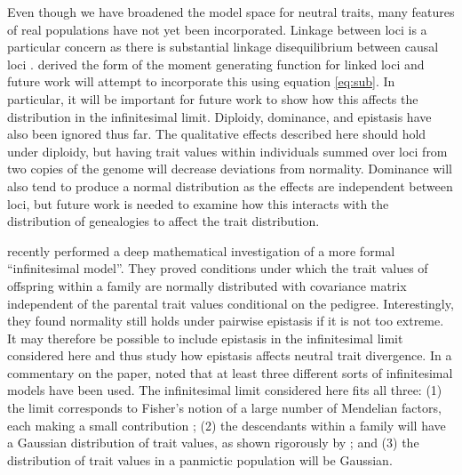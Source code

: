 Even though we have broadened the model space for neutral traits, many features
of real populations have not yet been incorporated. Linkage between loci is a
particular concern as there is substantial linkage disequilibrium between causal
loci \citep{Bulik-Sullivan2015}. \citet{Lohse2011} derived the form of the
moment generating function for linked loci and future work will attempt to
incorporate this using equation \eqref{eq:sub}. In particular, it will be
important for future work to show how this affects the distribution in the
infinitesimal limit. Diploidy, dominance, and epistasis have also been ignored
thus far. The qualitative effects described here should hold under diploidy, but
having trait values within individuals summed over loci from two copies of the
genome will decrease deviations from normality. Dominance will also tend to
produce a normal distribution as the effects are independent between loci, but
future work is needed to examine how this interacts with the distribution of
genealogies to affect the trait distribution.

\citet{Barton2017} recently performed a deep mathematical investigation of a
more formal ``infinitesimal model''. They proved conditions under which the
trait values of offspring within a family are normally distributed with
covariance matrix independent of the parental trait values conditional on the
pedigree. Interestingly, they found normality still holds under pairwise
epistasis if it is not too extreme. It may therefore be possible to include
epistasis in the infinitesimal limit considered here and thus study how
epistasis affects neutral trait divergence. In a commentary on the
\citet{Barton2017} paper, \citet{Turelli2017} noted that at least three
different sorts of infinitesimal models have been used. The infinitesimal limit
considered here fits all three: (1) the limit corresponds to Fisher's notion of
a large number of Mendelian factors, each making a small contribution
\citep{Fisher1918}; (2) the descendants within a family will have a Gaussian
distribution of trait values, as shown rigorously by \citet{Barton2017}; and
(3) the distribution of trait values in a panmictic population will be Gaussian.

